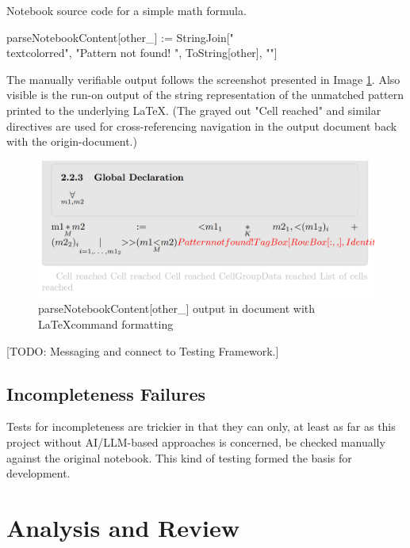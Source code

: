  \begin{program}
\caption{Notebook source code for a simple math formula.}
\label{prog:parseNotebookContent[other_]}
\begin{LaTeXCode}
parseNotebookContent[other_] := StringJoin["\\textcolor{red}{", "Pattern not found! ", ToString[other], "}"]
\end{LaTeXCode}
\end{program}

The manually verifiable output follows the screenshot presented in Image \ref{fig:parseNotebookContent[other_]-output}. Also visible is the run-on output of the string representation of the unmatched pattern printed to the underlying \LaTeX. (The grayed out "Cell reached" and similar directives are used for cross-referencing navigation in the output document back with the origin-document.)

\begin{figure}[h]
    \centering
    \includegraphics[scale=0.5]{images/closing/Screenshot 2024-03-08 171539.png}
    \caption{parseNotebookContent[other\_] output in document with \LaTeX command formatting}
    \label{fig:parseNotebookContent[other_]-output}
\end{figure}

[TODO: Messaging and connect to Testing Framework.]

\subsection{Incompleteness Failures}

Tests for incompleteness are trickier in that they can only, at least as far as this project without AI/LLM-based approaches is concerned, be checked manually against the original notebook. This kind of testing formed the basis for development.
 
 
\section{Analysis and Review}

